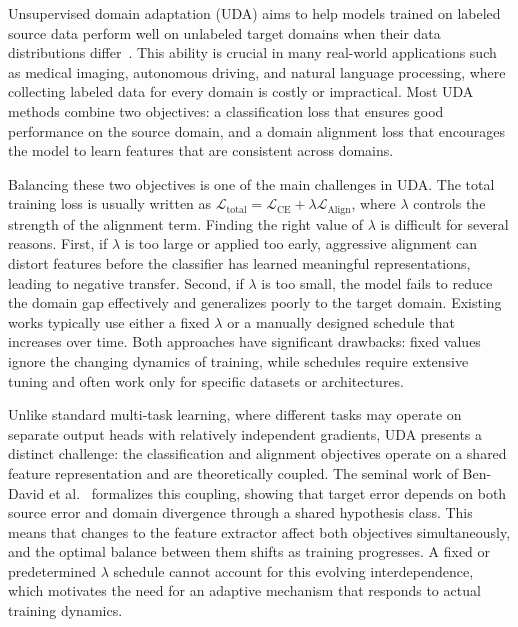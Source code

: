 \documentclass[pdflatex,sn-mathphys-num]{sn-jnl}
\theoremstyle{thmstyleone}
\theoremstyle{thmstyletwo}
\theoremstyle{thmstylethree}
\begin{document}
Unsupervised domain adaptation (UDA) aims to help models trained on labeled source data perform well on unlabeled target domains when their data distributions differ~\cite{bendavid2010theory,ganin2016dann}. This ability is crucial in many real-world applications such as medical imaging, autonomous driving, and natural language processing, where collecting labeled data for every domain is costly or impractical. Most UDA methods combine two objectives: a classification loss that ensures good performance on the source domain, and a domain alignment loss that encourages the model to learn features that are consistent across domains.

Balancing these two objectives is one of the main challenges in UDA. The total training loss is usually written as $\mathcal{L}_{\text{total}} = \mathcal{L}_{\text{CE}} + \lambda \mathcal{L}_{\text{Align}}$, where $\lambda$ controls the strength of the alignment term. Finding the right value of $\lambda$ is difficult for several reasons. First, if $\lambda$ is too large or applied too early, aggressive alignment can distort features before the classifier has learned meaningful representations, leading to negative transfer. Second, if $\lambda$ is too small, the model fails to reduce the domain gap effectively and generalizes poorly to the target domain. Existing works typically use either a fixed $\lambda$ or a manually designed schedule that increases over time. Both approaches have significant drawbacks: fixed values ignore the changing dynamics of training, while schedules require extensive tuning and often work only for specific datasets or architectures.

Unlike standard multi-task learning, where different tasks may operate on separate output heads with relatively independent gradients, UDA presents a distinct challenge: the classification and alignment objectives operate on a shared feature representation and are theoretically coupled. The seminal work of Ben-David et al.~\cite{bendavid2010theory} formalizes this coupling, showing that target error depends on both source error and domain divergence through a shared hypothesis class. This means that changes to the feature extractor affect both objectives simultaneously, and the optimal balance between them shifts as training progresses. A fixed or predetermined $\lambda$ schedule cannot account for this evolving interdependence, which motivates the need for an adaptive mechanism that responds to actual training dynamics.
\end{document}
